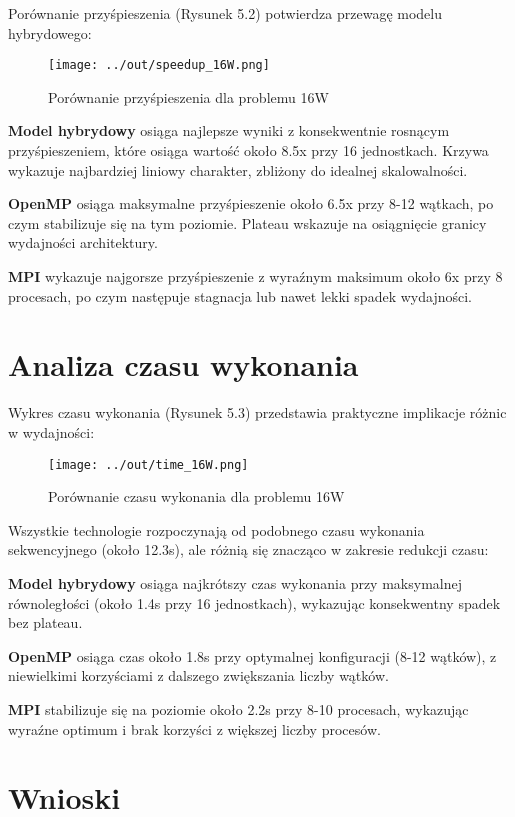 \documentclass[12pt,a4paper]{report}
\begin{document}
Porównanie przyśpieszenia (Rysunek 5.2) potwierdza przewagę modelu hybrydowego:

\begin{figure}[h]
    \centering
    \texttt{[image: ../out/speedup\_16W.png]}
    \caption{Porównanie przyśpieszenia dla problemu 16W}
    \label{fig:comparison_speedup}
\end{figure}

\textbf{Model hybrydowy} osiąga najlepsze wyniki z konsekwentnie rosnącym przyśpieszeniem, które osiąga wartość około 8.5x przy 16 jednostkach. Krzywa wykazuje najbardziej liniowy charakter, zbliżony do idealnej skalowalności.

\textbf{OpenMP} osiąga maksymalne przyśpieszenie około 6.5x przy 8-12 wątkach, po czym stabilizuje się na tym poziomie. Plateau wskazuje na osiągnięcie granicy wydajności architektury.

\textbf{MPI} wykazuje najgorsze przyśpieszenie z wyraźnym maksimum około 6x przy 8 procesach, po czym następuje stagnacja lub nawet lekki spadek wydajności.

\section{Analiza czasu wykonania}

Wykres czasu wykonania (Rysunek 5.3) przedstawia praktyczne implikacje różnic w wydajności:

\begin{figure}[h]
    \centering
    \texttt{[image: ../out/time\_16W.png]}
    \caption{Porównanie czasu wykonania dla problemu 16W}
    \label{fig:comparison_time}
\end{figure}

Wszystkie technologie rozpoczynają od podobnego czasu wykonania sekwencyjnego (około 12.3s), ale różnią się znacząco w zakresie redukcji czasu:

\textbf{Model hybrydowy} osiąga najkrótszy czas wykonania przy maksymalnej równoległości (około 1.4s przy 16 jednostkach), wykazując konsekwentny spadek bez plateau.

\textbf{OpenMP} osiąga czas około 1.8s przy optymalnej konfiguracji (8-12 wątków), z niewielkimi korzyściami z dalszego zwiększania liczby wątków.

\textbf{MPI} stabilizuje się na poziomie około 2.2s przy 8-10 procesach, wykazując wyraźne optimum i brak korzyści z większej liczby procesów.

\section{Wnioski}
\end{document}
